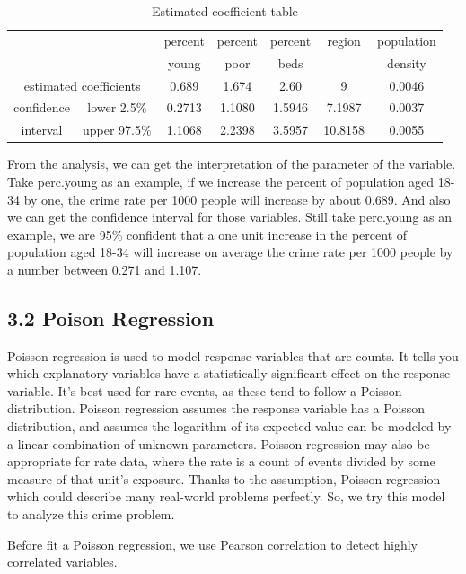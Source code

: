 \documentclass[oneside,11pt]{homework}
\begin{document}
\begin{table}[H]
\centering
\begin{tabular}{|c|c|c|c|c|c|c|}
\hline
\hline
\multicolumn{2}{|c|}{}&percent & percent  & percent & region & population\\
\multicolumn{2}{|c|}{}&young   & poor     & beds    &        & density  \\
\hline
\multicolumn{2}{|c|}{estimated coefficients} & 0.689 & 1.674& 2.60 & 9 & 0.0046\\
\hline
\hline
confidence&lower 2.5\% & 0.2713 & 1.1080& 1.5946 & 7.1987 & 0.0037\\
\cline{2-7}
interval&upper 97.5\% & 1.1068 & 2.2398& 3.5957 & 10.8158 & 0.0055\\
\hline
\end{tabular}
\caption{Estimated coefficient table}
\end{table}

From the analysis, we can get the interpretation of the parameter of the variable. Take perc.young as an example, if we increase the percent of population aged 18-34 by one, the crime rate per 1000 people will increase by about 0.689. And also we can get the confidence interval for those variables. Still take perc.young as an example, we are 95\% confident that a one unit increase in the percent of population aged 18-34 will increase on average the crime rate per 1000 people by a number between 0.271 and 1.107. \par


\subsection*{3.2 Poison Regression}
Poisson regression is used to model response variables that are counts. It tells you which explanatory variables have a statistically significant effect on the response variable. It’s best used for rare events, as these tend to follow a Poisson distribution. Poisson regression assumes the response variable has a Poisson distribution, and assumes the logarithm of its expected value can be modeled by a linear combination of unknown parameters. Poisson regression may also be appropriate for rate data, where the rate is a count of events divided by some measure of that unit's exposure. Thanks to the assumption, Poisson regression which could describe many real-world problems perfectly. So, we try this model to analyze this crime problem.\par

Before fit a Poisson regression, we use Pearson correlation to detect highly correlated variables. 
\end{document}
